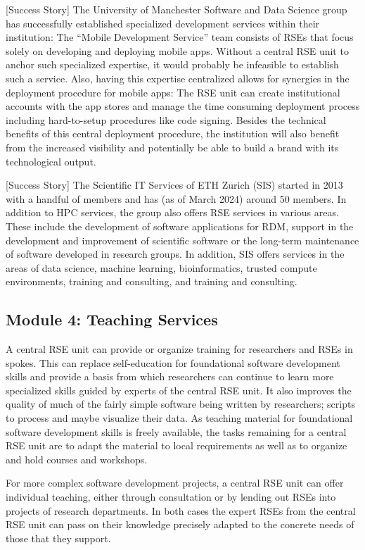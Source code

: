 \documentclass[a4paper]{article}
\begin{document}
[Success Story]
The University of Manchester Software and Data Science group has successfully established specialized development services within their institution:
The “Mobile Development Service” \autocite{manchester_mobile} team consists of RSEs that focus solely on developing and deploying mobile apps.
Without a central RSE unit to anchor such specialized expertise, it would probably be infeasible to establish such a service.
Also, having this expertise centralized allows for synergies in the deployment procedure for mobile apps:
The RSE unit can create institutional accounts with the app stores and manage the time consuming deployment process including hard-to-setup procedures like code signing.
Besides the technical benefits of this central deployment procedure, the institution will also benefit from the increased visibility and potentially be able to build a brand with its technological output.

[Success Story]
The Scientific IT Services of ETH Zurich (SIS) started in 2013 with a handful of members and has (as of March 2024) around 50 members.
In addition to HPC services, the group also offers RSE services in various areas.
These include the development of software applications for RDM, support in the development and improvement of scientific software or the long-term maintenance of software developed in research groups.
In addition, SIS offers services in the areas of data science, machine learning, bioinformatics, trusted compute environments, training and consulting, and training and consulting.

\subsection{Module 4: Teaching Services}%
\label{sec:teaching}

A central RSE unit can provide or organize training for researchers and RSEs in spokes.
This can replace self-education for foundational software development skills and provide a basis from which researchers can continue to learn more specialized skills guided by experts of the central RSE unit.
It also improves the quality of much of the fairly simple software being written by researchers; scripts to process and maybe visualize their data.
As teaching material for foundational software development skills is freely available,
the tasks remaining for a central RSE unit are to adapt the material to local requirements as well as to organize and hold courses and workshops.

For more complex software development projects, a central RSE unit can offer individual teaching, either through consultation or by lending out RSEs into projects of research departments.
In both cases the expert RSEs from the central RSE unit can pass on their knowledge precisely adapted to the concrete needs of those that they support.
\end{document}
